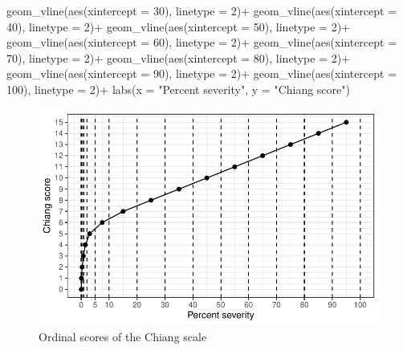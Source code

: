 \documentclass[
  letterpaper,
  DIV=11,
  numbers=noendperiod]{scrreprt}
\newenvironment{Shaded}{\begin{snugshade}}{\end{snugshade}}
\newcommand{\AttributeTok}[1]{\textcolor[rgb]{0.40,0.45,0.13}{#1}}
\newcommand{\DecValTok}[1]{\textcolor[rgb]{0.68,0.00,0.00}{#1}}
\newcommand{\FunctionTok}[1]{\textcolor[rgb]{0.28,0.35,0.67}{#1}}
\newcommand{\NormalTok}[1]{\textcolor[rgb]{0.00,0.23,0.31}{#1}}
\newcommand{\SpecialCharTok}[1]{\textcolor[rgb]{0.37,0.37,0.37}{#1}}
\newcommand{\StringTok}[1]{\textcolor[rgb]{0.13,0.47,0.30}{#1}}
\begin{document}
\begin{Shaded}
\begin{Highlighting}[]
  \FunctionTok{geom\_vline}\NormalTok{(}\FunctionTok{aes}\NormalTok{(}\AttributeTok{xintercept =} \DecValTok{30}\NormalTok{), }\AttributeTok{linetype =} \DecValTok{2}\NormalTok{)}\SpecialCharTok{+}
   \FunctionTok{geom\_vline}\NormalTok{(}\FunctionTok{aes}\NormalTok{(}\AttributeTok{xintercept =} \DecValTok{40}\NormalTok{), }\AttributeTok{linetype =} \DecValTok{2}\NormalTok{)}\SpecialCharTok{+}
   \FunctionTok{geom\_vline}\NormalTok{(}\FunctionTok{aes}\NormalTok{(}\AttributeTok{xintercept =} \DecValTok{50}\NormalTok{), }\AttributeTok{linetype =} \DecValTok{2}\NormalTok{)}\SpecialCharTok{+}
   \FunctionTok{geom\_vline}\NormalTok{(}\FunctionTok{aes}\NormalTok{(}\AttributeTok{xintercept =} \DecValTok{60}\NormalTok{), }\AttributeTok{linetype =} \DecValTok{2}\NormalTok{)}\SpecialCharTok{+}
   \FunctionTok{geom\_vline}\NormalTok{(}\FunctionTok{aes}\NormalTok{(}\AttributeTok{xintercept =} \DecValTok{70}\NormalTok{), }\AttributeTok{linetype =} \DecValTok{2}\NormalTok{)}\SpecialCharTok{+}
   \FunctionTok{geom\_vline}\NormalTok{(}\FunctionTok{aes}\NormalTok{(}\AttributeTok{xintercept =} \DecValTok{80}\NormalTok{), }\AttributeTok{linetype =} \DecValTok{2}\NormalTok{)}\SpecialCharTok{+}
   \FunctionTok{geom\_vline}\NormalTok{(}\FunctionTok{aes}\NormalTok{(}\AttributeTok{xintercept =} \DecValTok{90}\NormalTok{), }\AttributeTok{linetype =} \DecValTok{2}\NormalTok{)}\SpecialCharTok{+}
   \FunctionTok{geom\_vline}\NormalTok{(}\FunctionTok{aes}\NormalTok{(}\AttributeTok{xintercept =} \DecValTok{100}\NormalTok{), }\AttributeTok{linetype =} \DecValTok{2}\NormalTok{)}\SpecialCharTok{+}
  \FunctionTok{labs}\NormalTok{(}\AttributeTok{x =} \StringTok{"Percent severity"}\NormalTok{, }\AttributeTok{y =} \StringTok{"Chiang score"}\NormalTok{)}
\end{Highlighting}
\end{Shaded}

\begin{figure}[H]

{\centering \includegraphics{data-ordinal_files/figure-pdf/fig-chiagn-1.pdf}

}

\caption{\label{fig-chiagn}Ordinal scores of the Chiang scale}

\end{figure}
\end{document}
